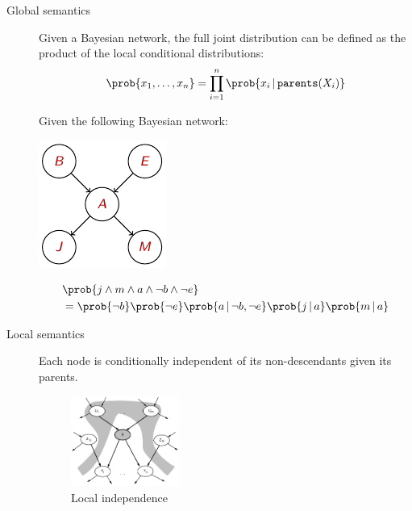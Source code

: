 \begin{description}
    \item[Global semantics] 
        Given a Bayesian network, the full joint distribution can be defined as
        the product of the local conditional distributions:
        \[ \prob{x_1, \dots, x_n} = \prod_{i=1}^{n} \prob{x_i \,\vert\, \texttt{parents}(X_i)} \]

        \begin{example}
            Given the following Bayesian network:

            \begin{minipage}{.3\linewidth}
                \centering
                \includegraphics[width=0.7\linewidth]{img/_global_semantics_example.pdf}
            \end{minipage}
            \begin{minipage}{.6\linewidth}
                \[ 
                    \begin{split}
                        &\prob{j \land m \land a \land \lnot b \land \lnot e} \\
                            &= \prob{\lnot b} \prob{\lnot e} \prob{a \,\vert\, \lnot b, \lnot e}
                                \prob{j \,\vert\, a} \prob{m \,\vert\, a}
                    \end{split}
                \]
            \end{minipage}
        \end{example}

    \item[Local semantics]
        Each node is conditionally independent of its non-descendants given its parents.
        \begin{figure}[h]
            \centering
            \includegraphics[width=0.35\textwidth]{img/_local_independence.pdf}
            \caption{Local independence}
        \end{figure}


\end{description}
